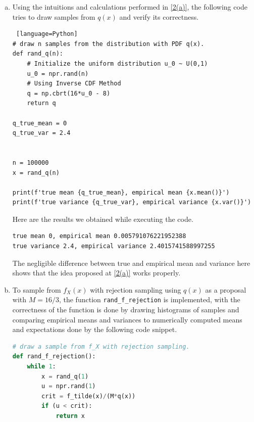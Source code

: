 \begin{enumerate} [(a)]
\begin{equation*}
	\end{equation*}
	Similarly, we have that $\mathrm{Var}_{q(x)}[X]$, which denotes the variance of $q(x)$, expressed as
	\begin{equation*}
		\begin{aligned}
			\mathrm{Var}_{q(x)}[X] &= E_{q(x)}[X^2] - \left(E_{q(x)}[X]\right)^2 \\
			&= \int_{-\infty}^{\infty} x^2 q(x)\mathrm{d}x \\
			&= \frac{3}{16} \int_{-2}^{2} x^4 \mathrm{d}x \\
			&= \frac{3}{80} \left[x^5\right]_{-2}^{2} = \frac{12}{5}
		\end{aligned}
	\end{equation*}
	\item \label{2(b)} Using the intuitions and calculations performed in \ref{2(a)}, the following code tries to draw samples from $q(x)$ and verify its correctness.
	\begin{lstlisting} [language=Python]
# draw n samples from the distribution with PDF q(x).
def rand_q(n):
	# Initialize the uniform distribution u_0 ~ U(0,1)
	u_0 = npr.rand(n)
	# Using Inverse CDF Method
	q = np.cbrt(16*u_0 - 8)
	return q

q_true_mean = 0 
q_true_var = 2.4


n = 100000
x = rand_q(n)

print(f'true mean {q_true_mean}, empirical mean {x.mean()}')
print(f'true variance {q_true_var}, empirical variance {x.var()}')
	\end{lstlisting}
	Here are the results we obtained while executing the code.
	\begin{verbatim}
true mean 0, empirical mean 0.005791076221952388
true variance 2.4, empirical variance 2.4015741588997255
	\end{verbatim}
	The negligible difference between true and empirical mean and variance here shows that the idea proposed at \ref{2(a)} works properly.
	\item \label{2(c)} To sample from $f_X(x)$ with rejection sampling using $q(x)$ as a proposal with $M = 16/3$, the function \verb|rand_f_rejection| is implemented, with the correctness of the function is done by drawing histograms of samples and comparing empirical means and variances to numerically computed means and expectations done by the following code snippet.
	\begin{lstlisting}[language=Python]
# draw a sample from f_X with rejection sampling.
def rand_f_rejection():
	while 1:
		x = rand_q(1)
		u = npr.rand(1)
		crit = f_tilde(x)/(M*q(x))
		if (u < crit):
			return x


\end{lstlisting}
\end{enumerate}
